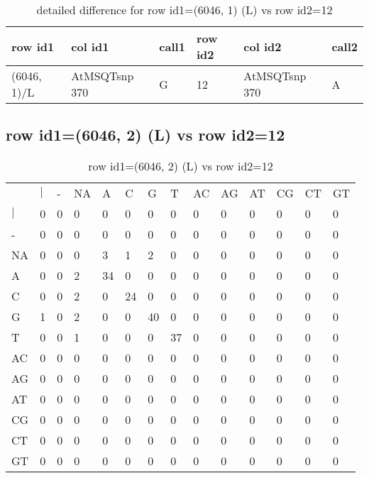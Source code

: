 \begin{center}
\begin{longtable}{|l|l|l|l|l|l|}
\caption{detailed difference for row id1=(6046, 1) (L) vs row id2=12} \label{table_dm35}\\
\hline
row id1&col id1&call1&row id2&col id2&call2\\
\hline
(6046, 1)/L&AtMSQTsnp 370&G&12&AtMSQTsnp 370&A\\
\hline
\end{longtable}
\end{center}

\subsection{row id1=(6046, 2) (L) vs row id2=12}
\begin{center}
\begin{longtable}{|l|l|l|l|l|l|l|l|l|l|l|l|l|l|}
\caption{row id1=(6046, 2) (L) vs row id2=12} \label{table_dm36}\\
\hline
\\
\hline
&$|$&-&NA&A&C&G&T&AC&AG&AT&CG&CT&GT\\
$|$&0&0&0&0&0&0&0&0&0&0&0&0&0\\
-&0&0&0&0&0&0&0&0&0&0&0&0&0\\
NA&0&0&0&3&1&2&0&0&0&0&0&0&0\\
A&0&0&2&34&0&0&0&0&0&0&0&0&0\\
C&0&0&2&0&24&0&0&0&0&0&0&0&0\\
G&1&0&2&0&0&40&0&0&0&0&0&0&0\\
T&0&0&1&0&0&0&37&0&0&0&0&0&0\\
AC&0&0&0&0&0&0&0&0&0&0&0&0&0\\
AG&0&0&0&0&0&0&0&0&0&0&0&0&0\\
AT&0&0&0&0&0&0&0&0&0&0&0&0&0\\
CG&0&0&0&0&0&0&0&0&0&0&0&0&0\\
CT&0&0&0&0&0&0&0&0&0&0&0&0&0\\
GT&0&0&0&0&0&0&0&0&0&0&0&0&0\\
\hline
\end{longtable}
\end{center}

